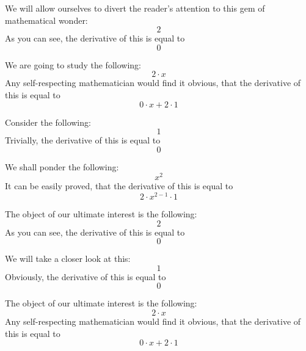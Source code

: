 \documentclass{article}
\begin{document}
We will allow ourselves to divert the reader's attention to this gem of mathematical wonder:
\begin{equation}
2 
\end{equation}
As you can see, the derivative of this is equal to
\begin{equation}
0 
\end{equation}

We are going to study the following:
\begin{equation}
2 \cdot x 
\end{equation}
Any self-respecting mathematician would find it obvious, that the derivative of this is equal to
\begin{equation}
0 \cdot x + 2 \cdot 1 
\end{equation}

Consider the following:
\begin{equation}
1 
\end{equation}
Trivially, the derivative of this is equal to
\begin{equation}
0 
\end{equation}

We shall ponder the following:
\begin{equation}
x ^{2 } 
\end{equation}
It can be easily proved, that the derivative of this is equal to
\begin{equation}
2 \cdot x ^{2 - 1 } \cdot 1 
\end{equation}

The object of our ultimate interest is the following:
\begin{equation}
2 
\end{equation}
As you can see, the derivative of this is equal to
\begin{equation}
0 
\end{equation}

We will take a closer look at this:
\begin{equation}
1 
\end{equation}
Obviously, the derivative of this is equal to
\begin{equation}
0 
\end{equation}

The object of our ultimate interest is the following:
\begin{equation}
2 \cdot x 
\end{equation}
Any self-respecting mathematician would find it obvious, that the derivative of this is equal to
\begin{equation}
0 \cdot x + 2 \cdot 1 
\end{equation}
\end{document}
